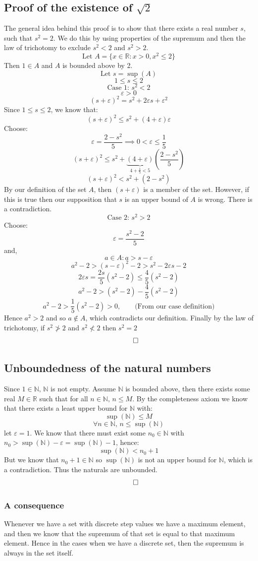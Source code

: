 \documentclass[12pt]{article}
\begin{document}
\subsection*{Proof of the existence of \(\sqrt{2}\)}
The general idea behind this proof is to show that there exists a real number \(s\), such that \(s^2=2\). We do this by using properties of the supremum and then the law of trichotomy to exclude \(s^2<2\) and \(s^2>2\).
\[\text{Let } A=\{x\in\mathbb{R}:x>0,x^2\leq2\}\]
Then \(1\in A\) and \(A\) is bounded above by 2.
\[\text{Let } s=\sup(A)\]
\[1\leq s\leq2\]
\[\text{Case 1: } s^2<2\]
\[\varepsilon>0\]
\[(s+\varepsilon)^2=s^2+2\varepsilon s+\varepsilon^2\]
Since \(1\leq s\leq2\), we know that:
\[(s+\varepsilon)^2\leq s^2+(4+\varepsilon)\varepsilon\]
Choose:
\[\varepsilon=\frac{2-s^2}{5}\implies0<\varepsilon\leq\frac{1}{5}\]
\[(s+\varepsilon)^2\leq s^2+\underbrace{(4+\varepsilon)}_{4+\frac{1}{5}<5}\left(\frac{2-s^2}{5}\right)\]
\[(s+\varepsilon)^2< s^2+(2-s^2)\]
By our definition of the set \(A\), then \((s+\varepsilon)\) is a member of the set. However, if this is true then our supposition that \(s\) is an upper bound of \(A\) is wrong. There is a contradiction.
\[\text{Case 2: }s^2>2\]
Choose:
\[\varepsilon=\frac{s^2-2}{5}\]
and,
\[a\in A:a>s-\varepsilon\]
\[a^2-2>(s-\varepsilon)^2-2>s^2-2\varepsilon s-2\]
\[2\varepsilon s=\frac{2s}{5}(s^2-2)\leq\frac{4}{5}(s^2-2)\]
\[a^2-2>(s^2-2)-\frac{4}{5}(s^2-2)\]
\[a^2-2>\frac{1}{5}(s^2-2)>0,\qquad\text{(From our case definition)}\]
Hence \(a^2>2\) and so \(a\notin A\), which contradicts our definition. Finally by the law of trichotomy, if \(s^2\ngtr2\) and \(s^2\nless2\) then \(s^2=2\)
\[\qed\]
\subsection*{Unboundedness of the natural numbers}
Since \(1\in\mathbb{N},\,\mathbb{N}\) is not empty. Assume \(\mathbb{N}\) is bounded above, then there exists some real \(M\in\mathbb{R}\) such that for all \(n\in\mathbb{N},\,n\leq M\). By the completeness axiom we know that there exists a least upper bound for \(\mathbb{N}\) with:
\[\sup(\mathbb{N})\leq M\]
\[\forall n\in\mathbb{N},\,n\leq\sup(\mathbb{N})\]
let \(\varepsilon=1\). We know that there must exist some \(n_0\in\mathbb{N}\) with \(n_0>\sup(\mathbb{N})-\varepsilon=\sup(\mathbb{N})-1\), hence:
\[\sup(\mathbb{N})<n_0+1\]
But we know that \(n_0+1\in\mathbb{N}\) so \(\sup(\mathbb{N})\) is not an upper bound for \(\mathbb{N}\), which is a contradiction. Thus the naturals are unbounded.
\[\qed\]
\subsubsection*{A consequence}
Whenever we have a set with discrete step values we have a maximum element, and then we know that the supremum of that set is equal to that maximum element. Hence in the cases when we have a discrete set, then the supremum is always in the set itself.
\end{document}
